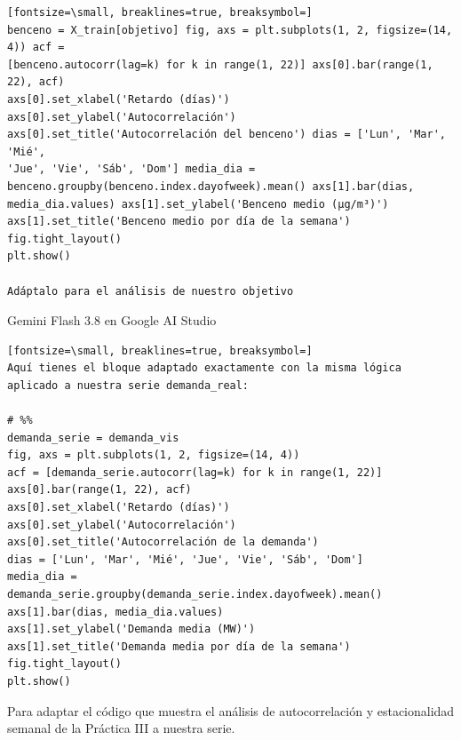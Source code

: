 \documentclass[12pt,a4paper,oneside]{book}
\begin{document}
\begin{iaprompt}
\begin{Verbatim}[fontsize=\small, breaklines=true, breaksymbol=]
benceno = X_train[objetivo] fig, axs = plt.subplots(1, 2, figsize=(14, 4)) acf =
[benceno.autocorr(lag=k) for k in range(1, 22)] axs[0].bar(range(1, 22), acf)
axs[0].set_xlabel('Retardo (días)') axs[0].set_ylabel('Autocorrelación')
axs[0].set_title('Autocorrelación del benceno') dias = ['Lun', 'Mar', 'Mié',
'Jue', 'Vie', 'Sáb', 'Dom'] media_dia =
benceno.groupby(benceno.index.dayofweek).mean() axs[1].bar(dias,
media_dia.values) axs[1].set_ylabel('Benceno medio (µg/m³)')
axs[1].set_title('Benceno medio por día de la semana') fig.tight_layout()
plt.show()

Adáptalo para el análisis de nuestro objetivo

\end{Verbatim}
\end{iaprompt}
\begin{iaresp}{Gemini Flash 3.8 en Google AI Studio}
\begin{Verbatim}[fontsize=\small, breaklines=true, breaksymbol=]
Aquí tienes el bloque adaptado exactamente con la misma lógica aplicado a nuestra serie demanda_real:

# %%
demanda_serie = demanda_vis
fig, axs = plt.subplots(1, 2, figsize=(14, 4))
acf = [demanda_serie.autocorr(lag=k) for k in range(1, 22)]
axs[0].bar(range(1, 22), acf)
axs[0].set_xlabel('Retardo (días)')
axs[0].set_ylabel('Autocorrelación')
axs[0].set_title('Autocorrelación de la demanda')
dias = ['Lun', 'Mar', 'Mié', 'Jue', 'Vie', 'Sáb', 'Dom']
media_dia = demanda_serie.groupby(demanda_serie.index.dayofweek).mean()
axs[1].bar(dias, media_dia.values)
axs[1].set_ylabel('Demanda media (MW)')
axs[1].set_title('Demanda media por día de la semana')
fig.tight_layout()
plt.show()
\end{Verbatim}
\end{iaresp}
\begin{iaanalisis}
Para adaptar el código que muestra el análisis de autocorrelación y estacionalidad semanal de la Práctica III a nuestra serie.
\end{iaanalisis}
\end{document}
